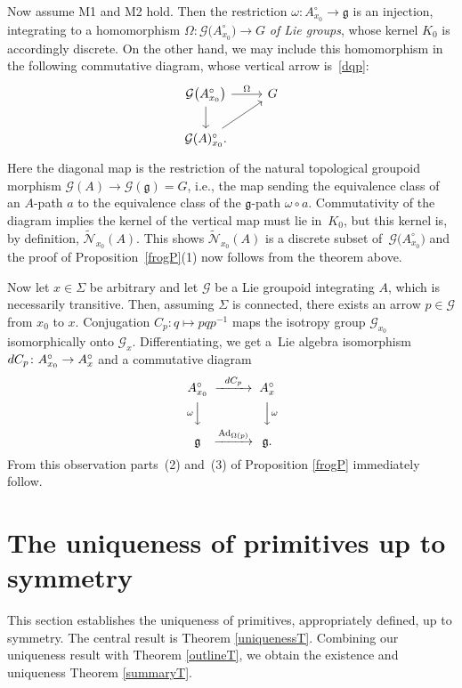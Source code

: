 \documentclass[11pt]{article}
\numberwithin{equation}{section}
\numberwithin{equation}{section}
\DeclareMathOperator{\Adjoint}{Ad}
\begin{document}
Now assume M1 and M2 hold. Then the restriction $\omega \colon
A^\circ_{x_0} \rightarrow {\mathfrak g} $ is an injection, integrating
to a homomorphism $\Omega \colon {\mathcal G}\big(A^\circ_{x_0}\big)
\rightarrow G$ {\em of Lie groups}, whose kernel $K_0$ is accordingly
discrete. On the other hand, we may include this homomorphism in the
following commutative diagram, whose vertical arrow is~\eqref{dqp}:
\begin{equation*}
 \begin{tikzcd} {\mathcal G}\big(A^\circ_{x_0}\big) \arrow{d}{}
\arrow{r}{\Omega} & G \\ {\mathcal G}(A)^\circ_{x_0}.
\arrow[swap]{ru}{} &
 \end{tikzcd}
\end{equation*} Here the diagonal map is the restriction of the natural
topological groupoid morphism ${\mathcal G}(A) \rightarrow {\mathcal
G}({\mathfrak g}) = G$, i.e., the map sending the equivalence class of
an $A$-path $a$ to the equivalence class of the ${\mathfrak g}$-path
$\omega \circ a$. Commutativity of the diagram implies the kernel of
the vertical map must lie in~$K_0$, but this kernel is, by definition,
$\tilde {\mathcal N}_{x_0}(A)$. This shows $\tilde {\mathcal
N}_{x_0}(A)$ is a discrete subset of~${\mathcal G}\big(A^\circ_{x_0}\big)$ and
the proof of Proposition~\ref{frogP}(1) now follows from the
theorem above.

Now let $x \in \Sigma $ be arbitrary and let ${\mathcal G} $ be a Lie
groupoid integrating $A$, which is necessarily transitive. Then,
assuming $\Sigma $ is connected, there exists an arrow $p \in
{\mathcal G} $ from $x_0$ to $x$. Conjugation $C_p\colon q \mapsto
pqp^{-1}$ maps the isotropy group ${\mathcal G}_{x_0}$ isomorphically
onto ${\mathcal G}_x$. Differentiating, we get a~Lie algebra
isomorphism ${\rm d}C_p \colon A^\circ_{x_0} \rightarrow A^\circ_x$ and a
commutative diagram
\begin{equation*}%
 \begin{CD} A^\circ_{x_0} @>{{\rm d}C_p}>> A^\circ_x \\ @V{\omega}VV
@VV{\omega}V \\ {\mathfrak g} @>{\Adjoint_{\Omega(p)}}>> {\mathfrak g}.
 \end{CD}
\end{equation*}
From this observation parts~(2) and~(3) of Proposition \ref{frogP} immediately follow.

\section{The uniqueness of primitives up to symmetry}\label{infch}
This section establishes the uniqueness of primitives, appropriately
defined, up to symmetry. The central result is Theorem
\ref{uniquenessT}. Combining our uniqueness result with Theorem
\ref{outlineT}, we obtain the existence and uniqueness Theorem
\ref{summaryT}.
\end{document}
